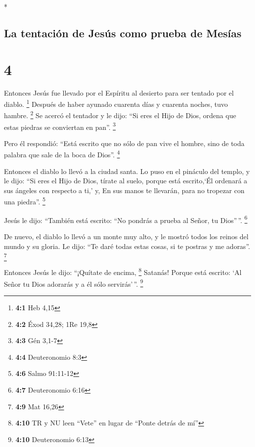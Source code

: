 \begin{paracol}{2}
\begin{otherlanguage}{english}
\end{otherlanguage}

\switchcolumn[0]*

\hypertarget{la-tentaciuxf3n-de-jesuxfas-como-prueba-de-mesuxedas}{%
\subsection{La tentación de Jesús como prueba de
Mesías}\label{la-tentaciuxf3n-de-jesuxfas-como-prueba-de-mesuxedas}}

\hypertarget{section-6}{%
\section{4}\label{section-6}}

 Entonces Jesús fue llevado por el Espíritu al desierto
para ser tentado por el diablo. \footnote{\textbf{4:1} Heb 4,15}
 Después de haber ayunado cuarenta días y cuarenta noches,
tuvo hambre. \footnote{\textbf{4:2} Éxod 34,28; 1Re 19,8} 
Se acercó el tentador y le dijo: ``Si eres el Hijo de Dios, ordena que
estas piedras se conviertan en pan''. \footnote{\textbf{4:3} Gén 3,1-7}

 Pero él respondió: ``Está escrito que no sólo de pan vive
el hombre, sino de toda palabra que sale de la boca de Dios''.
\footnote{\textbf{4:4} Deuteronomio 8:3}

 Entonces el diablo lo llevó a la ciudad santa. Lo puso en
el pináculo del templo,  y le dijo: ``Si eres el Hijo de
Dios, tírate al suelo, porque está escrito,`Él ordenará a sus ángeles
con respecto a ti,' y, En sus manos te llevarán, para no tropezar con
una piedra''. \footnote{\textbf{4:6} Salmo 91:11-12}

 Jesús le dijo: ``También está escrito: ``No pondrás a
prueba al Señor, tu Dios''\,''. \footnote{\textbf{4:7} Deuteronomio 6:16}

 De nuevo, el diablo lo llevó a un monte muy alto, y le
mostró todos los reinos del mundo y su gloria.  Le dijo:
``Te daré todas estas cosas, si te postras y me adoras''. \footnote{\textbf{4:9}
  Mat 16,26}

 Entonces Jesús le dijo: ``¡Quítate de encima,
\footnote{\textbf{4:10} TR y NU leen ``Vete'' en lugar de ``Ponte detrás
  de mí''} Satanás! Porque está escrito: `Al Señor tu Dios adorarás y a
él sólo servirás'\,''. \footnote{\textbf{4:10} Deuteronomio 6:13}


\end{paracol}
